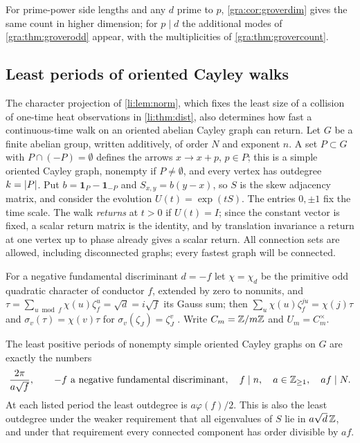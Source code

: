For prime-power side lengths and any $d$ prime to $p$, \cref{gra:cor:groverdim} gives the
same count in higher dimension; for $p\mid d$ the additional modes of
\cref{gra:thm:groverodd} appear, with the multiplicities of \cref{gra:thm:grovercount}.




\subsection{Least periods of oriented Cayley walks}\label{gra:sec:cayley}

The character projection of \cref{li:lem:norm}, which fixes the least size
of a collision of one-time heat observations in \cref{li:thm:dist}, also
determines how fast a continuous-time walk on an oriented abelian Cayley
graph can return. Let $G$ be a finite abelian group, written additively,
of order $N$ and exponent $n$. A set $P\subset G$ with $P\cap(-P)=\emptyset$
defines the arrows $x\to x+p$, $p\in P$; this is a simple oriented Cayley
graph, nonempty if $P\ne\emptyset$, and every vertex has outdegree
$k=\lvert P\rvert$. Put $b=\mathbf 1_P-\mathbf 1_{-P}$ and $S_{x,y}=b(y-x)$, so $S$
is the skew adjacency matrix, and consider the evolution $U(t)=\exp(tS)$.
The entries $0,\pm1$ fix the time scale. The walk \emph{returns} at $t>0$
if $U(t)=I$; since the constant vector is fixed, a scalar return matrix is
the identity, and by translation invariance a return at one vertex up to
phase already gives a scalar return. All connection sets are allowed,
including disconnected graphs; every fastest graph will be connected.

For a negative fundamental discriminant $d=-f$ let $\chi=\chi_d$ be the
primitive odd quadratic character of conductor $f$, extended by zero to
nonunits, and $\tau=\sum_{u\bmod f}\chi(u)\zeta_f^u=\sqrt d=i\sqrt f$ its
Gauss sum; then $\sum_u\chi(u)\zeta_f^{ju}=\chi(j)\tau$ and
$\sigma_v(\tau)=\chi(v)\tau$ for $\sigma_v(\zeta_J)=\zeta_J^v$
\cite{Davenport2000Multiplicative}. Write $C_m=\mathbb{Z}/m\mathbb{Z}$ and $U_m=C_m^\times$.

\begin{theorem}\label{gra:thm:cayleyperiods}
The least positive periods of nonempty simple oriented Cayley graphs on $G$
are exactly the numbers
\[
 \frac{2\pi}{a\sqrt f},\qquad -f\text{ a negative fundamental discriminant},\quad
 f\mid n,\quad a\in\mathbb{Z}_{\ge1},\quad af\mid N .
\]
At each listed period the least outdegree is $a\varphi(f)/2$. This is also
the least outdegree under the weaker requirement that all eigenvalues of
$S$ lie in $a\sqrt d\,\mathbb{Z}$, and under that requirement every connected
component has order divisible by $af$.
\end{theorem}


